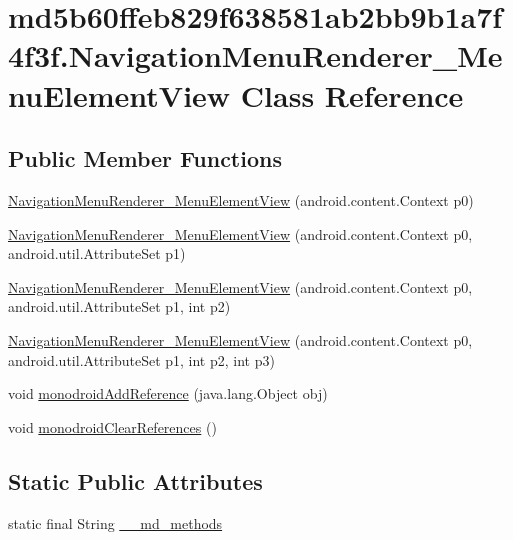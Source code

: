 \hypertarget{classmd5b60ffeb829f638581ab2bb9b1a7f4f3f_1_1_navigation_menu_renderer___menu_element_view}{
\section{md5b60ffeb829f638581ab2bb9b1a7f4f3f.NavigationMenuRenderer\_\-MenuElementView Class Reference}
\label{classmd5b60ffeb829f638581ab2bb9b1a7f4f3f_1_1_navigation_menu_renderer___menu_element_view}
}
\subsection*{Public Member Functions}
\begin{CompactItemize}
\item 
\hyperlink{classmd5b60ffeb829f638581ab2bb9b1a7f4f3f_1_1_navigation_menu_renderer___menu_element_view_0c5cb8c6adfb8c38c5cafccdc1af874f}{NavigationMenuRenderer\_\-MenuElementView} (android.content.Context p0)
\item 
\hyperlink{classmd5b60ffeb829f638581ab2bb9b1a7f4f3f_1_1_navigation_menu_renderer___menu_element_view_ebec519cc030b32200fdeb7e7e7b1a10}{NavigationMenuRenderer\_\-MenuElementView} (android.content.Context p0, android.util.AttributeSet p1)
\item 
\hyperlink{classmd5b60ffeb829f638581ab2bb9b1a7f4f3f_1_1_navigation_menu_renderer___menu_element_view_323eade9a3ca095a1c86090dcd3ae204}{NavigationMenuRenderer\_\-MenuElementView} (android.content.Context p0, android.util.AttributeSet p1, int p2)
\item 
\hyperlink{classmd5b60ffeb829f638581ab2bb9b1a7f4f3f_1_1_navigation_menu_renderer___menu_element_view_d921ddeb62129b3f4bc0bf30c9f04165}{NavigationMenuRenderer\_\-MenuElementView} (android.content.Context p0, android.util.AttributeSet p1, int p2, int p3)
\item 
void \hyperlink{classmd5b60ffeb829f638581ab2bb9b1a7f4f3f_1_1_navigation_menu_renderer___menu_element_view_ddd20286455393e3d32e5f4697d6b870}{monodroidAddReference} (java.lang.Object obj)
\item 
void \hyperlink{classmd5b60ffeb829f638581ab2bb9b1a7f4f3f_1_1_navigation_menu_renderer___menu_element_view_34c2e11f6c978d883b8411da596cc99d}{monodroidClearReferences} ()
\end{CompactItemize}
\subsection*{Static Public Attributes}
\begin{CompactItemize}
\item 
static final String \hyperlink{classmd5b60ffeb829f638581ab2bb9b1a7f4f3f_1_1_navigation_menu_renderer___menu_element_view_04d38a07cbc75040c62aaa944c9b4174}{\_\-\_\-md\_\-methods}
\end{CompactItemize}
